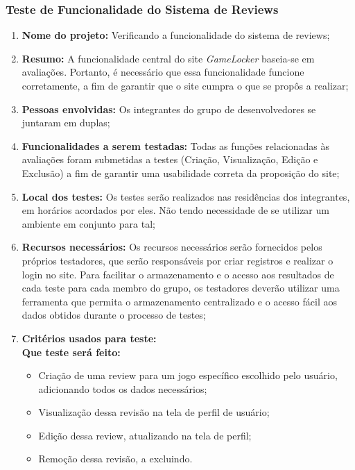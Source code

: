 \subsubsection{Teste de Funcionalidade do Sistema de Reviews}
\begin{enumerate}

\item{\textbf{Nome do projeto:}}
Verificando a funcionalidade do sistema de reviews;

\item{\textbf{Resumo:}}
A funcionalidade central do site \textit{GameLocker} baseia-se em avaliações. Portanto, é necessário que essa funcionalidade funcione corretamente, a fim de garantir que o site cumpra o que se propôs a realizar;

\item{\textbf{Pessoas envolvidas:}}
Os integrantes do grupo de desenvolvedores se juntaram em duplas;

\item{\textbf{Funcionalidades a serem testadas:}}
Todas as funções relacionadas às avaliações foram submetidas a testes (Criação, Visualização, Edição e Exclusão) a fim de garantir uma usabilidade correta da proposição do site;

\item{\textbf{Local dos testes:}}
Os testes serão realizados nas residências dos integrantes, em horários acordados por eles. Não tendo necessidade de se utilizar um ambiente em conjunto para tal;

\item{\textbf{Recursos necessários:}}
Os recursos necessários serão fornecidos pelos próprios testadores, que serão responsáveis por criar registros e realizar o login no site. Para facilitar o armazenamento e o acesso aos resultados de cada teste para cada membro do grupo, os testadores deverão utilizar uma ferramenta que permita o armazenamento centralizado e o acesso fácil aos dados obtidos durante o processo de testes;

\item{\textbf{Critérios usados para teste:}}
\\
\textbf{Que teste será feito:} 
\begin{itemize}
\item Criação de uma review para um jogo específico escolhido pelo usuário, adicionando todos os dados necessários;
\item Visualização dessa revisão na tela de perfil de usuário;
\item Edição dessa review, atualizando na tela de perfil;
\item Remoção dessa revisão, a excluindo.
\end{itemize}


\end{enumerate}
